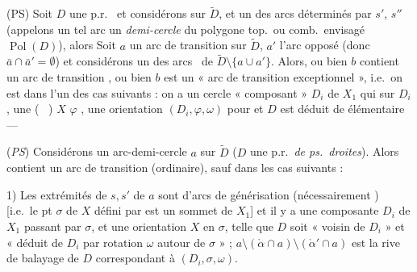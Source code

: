 \documentclass[11pt,a4paper]{article}
\begin{document}

(PS) Soit $D$ une p.r.\ \struck{\ill{}} \struck{[\ill{} \ill{} \ill{} \ill{} \ill{} des ps.\ dr., soit $s \in D \cap X_1$,} et considérons \struck{\ill{} \ill{}}   sur $\widetilde{D}$, et un des arcs déterminés  par $s'$, $s''$ (appelons un tel arc un \emph{demi-cercle} du polygone top.\ ou comb.\ envisagé $\operatorname{Pol}(D)$), alors  \struck{\ill{}} 
Soit $a$ un arc de transition  sur $\widetilde{D}$, $a'$ l'arc opposé (donc $\bar{a} \cap \bar{a}' = \emptyset$) et considérons  un des arcs  \ de $\widetilde{D} \setminus \lbrace a \cup a' \rbrace$. Alors, ou bien $b$ contient un arc de transition , ou bien $b$ \struck{\ill{}} est un « arc de transition exceptionnel », i.e.\ on est dans l'un des cas suivants : on a un cercle « composant » $D_i$ de $X_1$ qui   sur $D_i$, une \struck{\ill{}}  (\   \ill{})  $X$  $\varphi$ \struck{\ill{} \ill{}}, une orientation  $(D_i, \varphi, \omega)$ pour et $D$ est déduit de  élémentaire ---

(\emph{PS}) Considérons un arc-demi-cercle $a$ sur $\widetilde{D}$ ($D$ une p.r.\ \emph{de ps.\ droites}). Alors \struck{\ill{}}  contient un arc de transition (ordinaire), sauf dans les  cas suivants :

 1) Les extrémités de $s, s'$ de $a$ \struck{\ill{}} sont  d'arcs de générisation  (nécessairement ) [i.e.\ le pt $\sigma$ de $X$ défini par  est un sommet de $X_1$] et il y a une composante $D_i$ de $X_1$ passant par $\sigma$, et une orientation  $X$ en $\sigma$, telle que $D$ soit  « voisin de $D_i$ » et « déduit de $D_i$ par  rotation $\omega$ autour de $\sigma$ » ; $a \setminus (\mathring{\alpha} \cap a) \setminus (\mathring{\alpha}' \cap a)$ est la rive de balayage de $D$ correspondant à $(D_i, \sigma, \omega)$.
\end{document}

